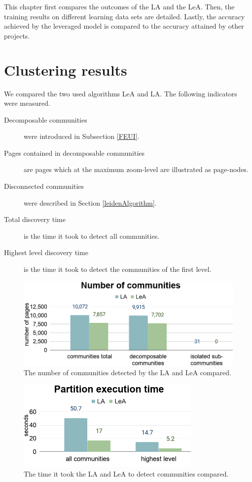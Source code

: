 \label{evaluation}
This chapter first compares the outcomes of the LA and the LeA. Then, the training results on different learning data sets are detailed. Lastly, the accuracy achieved by the leveraged model is compared to the accuracy attained by other projects.
\section{Clustering results}\label{clusteringEvaluation}
We compared the two used algorithms LeA and LA. The following indicators were measured. 
\begin{description}
    \item[Decomposable communities] were introduced in Subsection \ref{FEUI}.
    \item[Pages contained in decomposable communities] are pages which at the maximum zoom-level are illustrated as page-nodes.
    \item[Disconnected communities] were described in Section \ref{leidenAlgorithm}.
    \item[Total discovery time] is the time it took to detect all communities.
    \item[Highest level discovery time] is the time it took to detect the communities of the first level.
\end{description}

\begin{figure}[ht!]
  \centering
  \includegraphics[width=\textwidth]{Images/CommunitiesComparison.png}
  \caption{The number of communities detected by the LA and LeA compared. }
  \label{CommunitiesComparison}
\end{figure}

\begin{figure}[ht!]
  \centering
  \includegraphics[width=0.8\textwidth]{Images/PartitionTimeComparison.png}
  \caption{The time it took the LA and LeA to detect communities compared.}
  \label{PartitionTimeComparison}
\end{figure}

